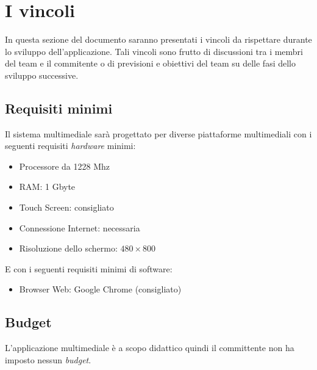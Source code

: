 \section{I vincoli}
In questa sezione del documento saranno presentati i vincoli da rispettare durante lo sviluppo dell'applicazione. Tali vincoli sono frutto di discussioni tra i membri del team e il commitente o di previsioni e obiettivi del team su delle fasi dello sviluppo successive.

\subsection{Requisiti minimi}
Il sistema multimediale sarà progettato per diverse piattaforme multimediali con i seguenti requisiti \emph{hardware} minimi:
\begin{itemize}
	\item Processore da 1228 Mhz
	\item RAM: 1 Gbyte
	\item Touch Screen: consigliato 
	\item Connessione Internet: necessaria
	\item Risoluzione dello schermo: $480 \times 800$
\end{itemize}
E con i seguenti requisiti minimi di software:
\begin{itemize}
	\item Browser Web: Google Chrome (consigliato)
\end{itemize}

\subsection{Budget}
L'applicazione multimediale è a scopo didattico quindi il committente non ha imposto nessun \emph{budget}.
